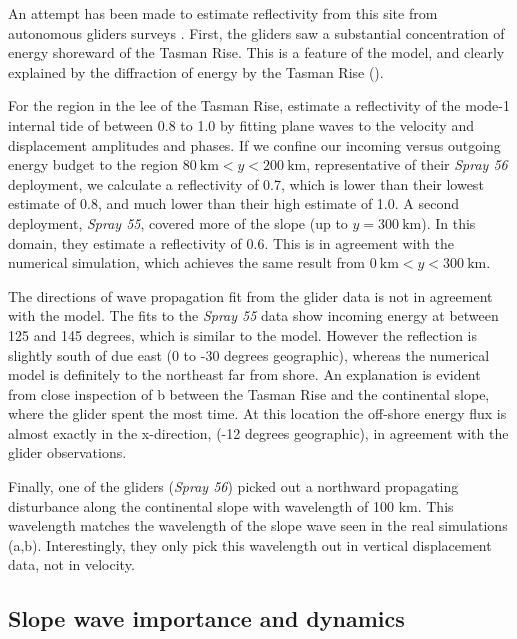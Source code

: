 \documentclass[12pt]{article}
\begin{document}
An attempt has been made to estimate reflectivity from this site from autonomous gliders surveys \citep{johnstonetal15}.  First, the gliders saw a substantial concentration of energy shoreward of the Tasman Rise.  This is a feature of the model, and clearly explained by the diffraction of energy by the Tasman Rise ().   

For the region in the lee of the Tasman Rise, \citet{johnstonetal15} estimate a reflectivity of the mode-1 internal tide of between 0.8 to 1.0 by fitting plane waves to the velocity and displacement amplitudes and phases.  If we confine our incoming versus outgoing energy budget to the region $80\ \mathrm{km}< y < 200\ \mathrm{km}$, representative of their \emph{Spray 56} deployment, we calculate a reflectivity of 0.7, which is lower than their lowest estimate of 0.8, and much lower than their high estimate of 1.0.  A second deployment, \emph{Spray 55}, covered more of the slope (up to $y=300\ \mathrm{km}$).  In this domain, they estimate a reflectivity of 0.6.  This is in agreement with the numerical simulation, which achieves  the same result from $0\ \mathrm{km}< y < 300\ \mathrm{km}$.  

The directions of wave propagation fit from the glider data is not in agreement with the model.  The fits to the \emph{Spray 55} data show incoming energy at between 125 and 145 degrees, which is similar to the model.  However the reflection is slightly south of due east (0 to -30 degrees geographic), whereas the numerical model is definitely to the northeast far from shore.  An explanation is evident from close inspection of b between the Tasman Rise and the continental slope, where the glider spent the most time.  At this location the off-shore energy flux is almost exactly in the x-direction, (-12 degrees geographic), in agreement with the glider observations.  

Finally, one of the gliders (\emph{Spray 56}) picked out a northward propagating disturbance along the continental slope with wavelength of 100 km.  This wavelength matches the wavelength of the slope wave seen in the real simulations (a,b).  Interestingly, they only pick this wavelength out in vertical displacement data, not in velocity.  


\subsection{Slope wave importance and dynamics}
\end{document}
